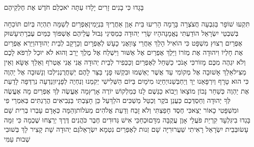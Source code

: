 \documentclass[../main/main.tex]{subfiles}
\begin{document}
\begin{multicols*}{\ncols}
בָּגָדוּ כִּי בָנִים זָרִים יָלָדוּ עַתָּה יֹאכְלֵם חֹדֶשׁ אֶת חֶלְקֵיהֶם\OpenSection{}\par
{}תִּקְעוּ שׁוֹפָר בַּגִּבְעָה חֲצֹצְרָה בָּרָמָה הָרִיעוּ בֵּית אָוֶן אַחֲרֶיךָ בִּנְיָמִין\PreVerseSpace{}אֶפְרַיִם לְשַׁמָּה תִהְיֶה בְּיוֹם תּוֹכֵחָה בְּשִׁבְטֵי יִשְׂרָאֵל הוֹדַעְתִּי נֶאֱמָנָה\PreVerseSpace{}הָיוּ שָׂרֵי יְהוּדָה כְּמַסִּיגֵי גְּבוּל עֲלֵיהֶם אֶשְׁפּוֹךְ כַּמַּיִם עֶבְרָתִי\PreVerseSpace{}עָשׁוּק אֶפְרַיִם רְצוּץ מִשְׁפָּט כִּי הוֹאִיל הָלַךְ אַחֲרֵי צָו\PreVerseSpace{}וַאֲנִי כָעָשׁ לְאֶפְרָיִם וְכָרָקָב לְבֵית יְהוּדָה\PreVerseSpace{}וַיַּרְא אֶפְרַיִם אֶת חָלְיוֹ וִיהוּדָה אֶת מְזֹרוֹ וַיֵּלֶךְ אֶפְרַיִם אֶל אַשּׁוּר וַיִּשְׁלַח אֶל מֶלֶךְ יָרֵב וְהוּא לֹא יוּכַל לִרְפֹּא לָכֶם וְלֹא יִגְהֶה מִכֶּם מָזוֹר\PreVerseSpace{}כִּי אָנֹכִי כַשַּׁחַל לְאֶפְרַיִם וְכַכְּפִיר לְבֵית יְהוּדָה אֲנִי אֲנִי אֶטְרֹף וְאֵלֵךְ אֶשָּׂא וְאֵין מַצִּיל\PreVerseSpace{}אֵלֵךְ אָשׁוּבָה אֶל מְקוֹמִי עַד אֲשֶׁר יֶאְשְׁמוּ וּבִקְשׁוּ פָנָי בַּצַּר לָהֶם יְשַׁחֲרֻנְנִי\PreChapterSpace{}לְכוּ וְנָשׁוּבָה אֶל יַהְוֶה כִּי הוּא טָרָף וְיִרְפָּאֵנוּ יַךְ וְיַחְבְּשֵׁנוּ\PreVerseSpace{}יְחַיֵּנוּ מִיֹּמָיִם בַּיּוֹם הַשְּׁלִישִׁי יְקִמֵנוּ וְנִחְיֶה לְפָנָיו\PreVerseSpace{}וְנֵדְעָה נִרְדְּפָה לָדַעַת אֶת יַהְוֶה כְּשַׁחַר נָכוֹן מוֹצָאוֹ וְיָבוֹא כַגֶּשֶׁם לָנוּ כְּמַלְקוֹשׁ יוֹרֶה אָרֶץ\PreVerseSpace{}מָה אֶעֱשֶׂה לְּךָ אֶפְרַיִם מָה אֶעֱשֶׂה לְּךָ יְהוּדָה וְחַסְדְּכֶם כַּעֲנַן בֹּקֶר וְכַטַּל מַשְׁכִּים הֹלֵךְ\PreVerseSpace{}עַל כֵּן חָצַבְתִּי בַּנְּבִיאִים הֲרַגְתִּים בְּאִמְרֵי פִי וּמִשְׁפָּטִי כָאוֹר\SubEnd{} יֵצֵא\PreVerseSpace{}כִּי חֶסֶד חָפַצְתִּי וְלֹא זָבַח וְדַעַת אֱלֹהִים מֵעֹלוֹת\PreVerseSpace{}וְהֵמָּה כְּאָדָם עָבְרוּ בְרִית שָׁם בָּגְדוּ בִי\PreVerseSpace{}גִּלְעָד קִרְיַת פֹּעֲלֵי אָוֶן עֲקֻבָּה מִדָּם\PreVerseSpace{}וּכְחַכֵּי אִישׁ גְּדוּדִים חֶבֶר כֹּהֲנִים דֶּרֶךְ יְרַצְּחוּ שֶׁכְמָה כִּי זִמָּה עָשׂוּ\PreVerseSpace{}בְּבֵית יִשְׂרָאֵל רָאִיתִי שַׁעֲרוּרִיָּה\SubEnd{} שָׁם זְנוּת לְאֶפְרַיִם נִטְמָא יִשְׂרָאֵל\PreVerseSpace{}גַּם יְהוּדָה שָׁת קָצִיר לָךְ בְּשׁוּבִי שְׁבוּת עַמִּי\OpenSection{}\par

\end{multicols*}
\end{document}
